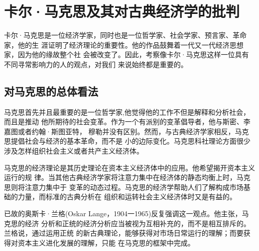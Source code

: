 \chapter{卡尔·马克思及其对古典经济学的批判}

卡尔·马克思是一位经济学家，同时也是一位哲学家、社会学家、预言家、革命家，他的生
涯证明了经济理论的重要性。他的作品鼓舞着一代又一代经济思想家，因为他的缘故整个社
会被改变了。因此，考察像卡尔·马克思这样一位具有不同寻常影响力的人的观点，对我们
来说始终都是重要的。

\section{对马克思的总体看法}

马克思首先并且最重要的是一位哲学家,他觉得他的工作不但是解释和分析社会，而且是推动
他所期待的社会变革。作为一个有派别的变革倡导者，他与斯密、李嘉图或者约翰·斯图亚特，
穆勒并没有区别。然而，与古典经济学家相反，马克思提倡社会与经济的基本革命，而不是
小的边际变化。马克思科社理论方面很少涉及怎样组织社会主义或者共产主义经济体。

马克思的经济理论是其历史理论在资本主义经济体中的应用。他希望揭开资本主义运行的规
律。当其他古典经济学家将注意力集中在经济体的静态均衡上时，马克思则将注意力集中于
变革的动态过程。马克思的经济学帮助人们了解构成市场基础的力量，而标准的古典分析在
组织和运转社会主义经济体时又是有益的。

已故的奥斯卡·兰格(Oskar Lange，1904一1965)反复强调这一观点。他主张，马克思的经济
分析和正统的经济分析应当被视为互相补充的，而不是相互排斥的。兰格说，通过运用正统
的新古典理论，能够获得对市场日常运行的理解；而要获得对资本主义进化发展的理解，只能
在马克思的框架中完成。


